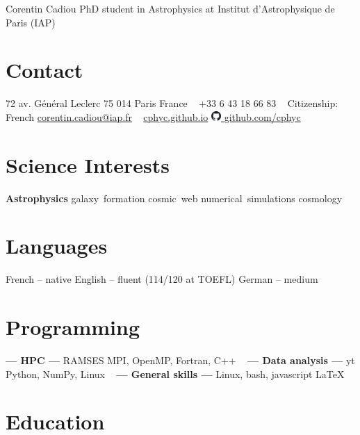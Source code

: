 \documentclass[]{cv-style}
\begin{document}
\header
{Corentin}
{Cadiou}
{PhD student in Astrophysics at Institut d'Astrophysique de Paris (IAP)}


\begin{aside}
\section{Contact}
72 av. Général Leclerc
75 014 Paris
France
~
+33 6 43 18 66 83
~
Citizenship: French
\href{mailto:corentin.cadiou@iap.fr}{corentin.cadiou@iap.fr}
~
\href{https://cphyc.github.io/}{cphyc.github.io}
\href{https://github.com/cphyc}{\includegraphics[height=1em]{240px-Octicons-mark-github.png} github.com/cphyc}
%
\section{Science Interests}
\textbf{Astrophysics}
galaxy~formation
cosmic~web
numerical~simulations
cosmology
% 
\section{Languages}
French -- native
English -- fluent (114/120 at TOEFL)
German -- medium
%
\section{Programming}
\textbf{— HPC —}
RAMSES
MPI, OpenMP, Fortran, C++
~
\textbf{— Data analysis —}
yt
Python, NumPy, Linux
~
\textbf{— General skills —}
Linux, bash, javascript
\LaTeX
%
\end{aside}


\section{Education}
\end{document}
